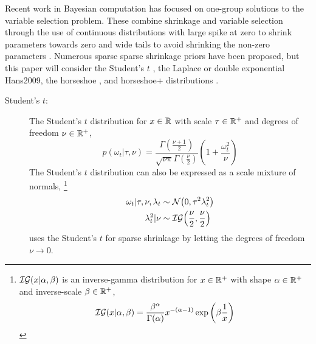 \documentclass[12pt]{article}
\begin{document}
Recent work in Bayesian computation has focused on one-group solutions to the variable selection problem.
These combine shrinkage and variable selection through the use of continuous distributions with large spike at zero to shrink parameters towards zero and wide tails to avoid shrinking the non-zero parameters \parencite{PolsonScott2010}.
Numerous sparse sparse shrinkage priors have been proposed, but this paper will consider the Student's $t$  \parencite{Tipping2001}, the Laplace or double exponential \parencite{ParkCasella2008}{Hans2009}, the horseshoe \parencite{CarvalhoPolsonScott2010}, and horseshoe+ distributions \parencite{BhadraDattaPolsonEtAl2015a}.

\begin{description}
\item[Student's $t$:] The Student's $t$ distribution for $x \in \mathbb{R}$  with scale $\tau \in \mathbb{R}^{+}$ and degrees of freedom $\nu \in \mathbb{R}^{+}$,
\begin{equation}
  \label{dlm:eq:6}
  p(\omega_{t} | \tau, \nu) = \frac{\Gamma\left(\frac{\nu + 1}{2}\right)}{\sqrt{\nu \pi} \Gamma\left( \frac{\nu}{2} \right)} \left( 1 + \frac{\omega_{t}^{2}}{\nu} \right)
\end{equation}
The Student's $t$ distribution can also be expressed as a scale mixture of normals,%
\footnote{
  $\mathcal{IG}\mathopen{}\left(x | \alpha, \beta\right)\mathclose{}$ is an inverse-gamma distribution for $x \in \mathbb{R}^{+}$ with shape $\alpha \in \mathbb{R}^{+}$ and inverse-scale $\beta \in \mathbb{R}^{+}$,
  \begin{equation}
    \label{dlm:eq:9}
    \mathcal{IG}\mathopen{}\left(x | \alpha, \beta\right)\mathclose{} = \frac{\beta^{\alpha}}{\Gamma(\alpha)} x^{-(\alpha - 1)} \exp
    \left(
      \beta \frac{1}{x}
    \right)
  \end{equation}
}
\begin{equation}
  \label{dlm:eq:5}
  \begin{aligned}[t]
  \omega_{t} | \tau, \nu, \lambda_{t} &\sim \mathcal{N}\mathopen{}\left(0, \tau^{2} \lambda_{t}^{2}\right)\mathclose{} \\
  \lambda_{t}^{2} | \nu & \sim \mathcal{IG}\mathopen{}\left(\frac{\nu}{2}, \frac{\nu}{2}\right)\mathclose{}
  \end{aligned}
\end{equation}
\parencite{Tipping2001} uses the Student's $t$ for sparse shrinkage by letting the degrees of freedom $\nu \to 0$.


\end{description}
\end{document}
